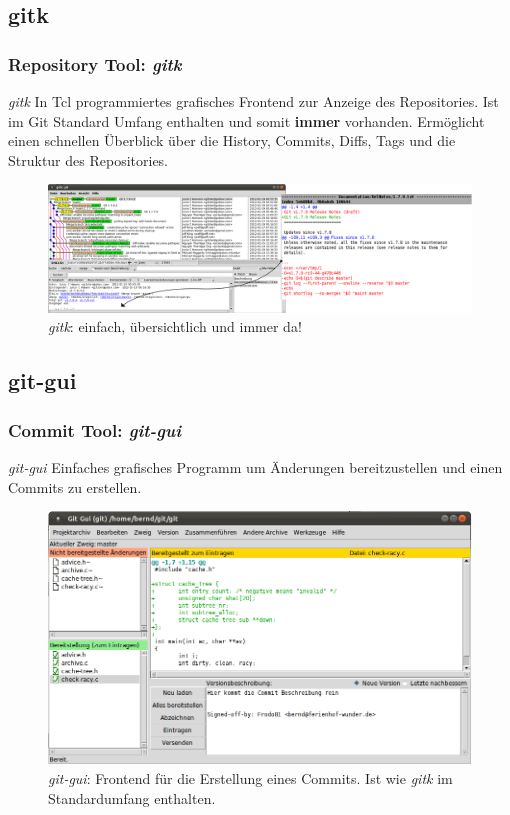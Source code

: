 \documentclass{beamer}
\begin{document}
\subsection{gitk}

\begin{frame}\frametitle{Repository Tool: \textit{gitk}}
\begin{block}{\textit{gitk}}
In Tcl programmiertes grafisches Frontend zur Anzeige des Repositories. Ist im Git Standard Umfang enthalten und somit \textbf{immer} vorhanden. Ermöglicht einen schnellen Überblick über die History, Commits, Diffs, Tags und die Struktur des Repositories. 
\end{block}

\begin{figure}
\includegraphics[scale=0.7]{Bilder/gitk} 
\caption{\textit{gitk}: einfach, übersichtlich und immer da!}
\end{figure}
\end{frame}

\subsection{git-gui}
\begin{frame}\frametitle{Commit Tool: \textit{git-gui}}
\begin{block}{\textit{git-gui}}
Einfaches grafisches Programm um Änderungen bereitzustellen und einen Commits zu erstellen. 
\end{block}

\begin{figure}
\includegraphics[scale=1.1]{Bilder/git_gui} 
\caption{\textit{git-gui}: Frontend für die Erstellung eines Commits. Ist wie \textit{gitk} im Standardumfang enthalten.}
\end{figure}
\end{frame}
\end{document}
